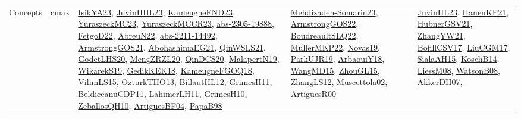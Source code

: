 {\begin{longtable}{lp{3cm}>{\raggedright}p{6cm}>{\raggedright}p{6cm}p{8cm}}
Concepts & cmax & \href{articles/IsikYA23.pdf}{IsikYA23}\cite{IsikYA23}, \href{papers/JuvinHHL23.pdf}{JuvinHHL23}\cite{JuvinHHL23}, \href{papers/KameugneFND23.pdf}{KameugneFND23}\cite{KameugneFND23}, \href{papers/YuraszeckMC23.pdf}{YuraszeckMC23}\cite{YuraszeckMC23}, \href{articles/YuraszeckMCCR23.pdf}{YuraszeckMCCR23}\cite{YuraszeckMCCR23}, \href{articles/abs-2305-19888.pdf}{abs-2305-19888}\cite{abs-2305-19888}, \href{articles/FetgoD22.pdf}{FetgoD22}\cite{FetgoD22}, \href{articles/AbreuN22.pdf}{AbreuN22}\cite{AbreuN22}, \href{articles/abs-2211-14492.pdf}{abs-2211-14492}\cite{abs-2211-14492}, \href{papers/ArmstrongGOS21.pdf}{ArmstrongGOS21}\cite{ArmstrongGOS21}, \href{articles/AbohashimaEG21.pdf}{AbohashimaEG21}\cite{AbohashimaEG21}, \href{articles/QinWSLS21.pdf}{QinWSLS21}\cite{QinWSLS21}, \href{papers/GodetLHS20.pdf}{GodetLHS20}\cite{GodetLHS20}, \href{articles/MengZRZL20.pdf}{MengZRZL20}\cite{MengZRZL20}, \href{articles/QinDCS20.pdf}{QinDCS20}\cite{QinDCS20}, \href{papers/MalapertN19.pdf}{MalapertN19}\cite{MalapertN19}, \href{articles/WikarekS19.pdf}{WikarekS19}\cite{WikarekS19}, \href{articles/GedikKEK18.pdf}{GedikKEK18}\cite{GedikKEK18}, \href{papers/KameugneFGOQ18.pdf}{KameugneFGOQ18}\cite{KameugneFGOQ18}, \href{papers/VilimLS15.pdf}{VilimLS15}\cite{VilimLS15}, \href{articles/OzturkTHO13.pdf}{OzturkTHO13}\cite{OzturkTHO13}, \href{papers/BillautHL12.pdf}{BillautHL12}\cite{BillautHL12}, \href{papers/GrimesH11.pdf}{GrimesH11}\cite{GrimesH11}, \href{articles/BeldiceanuCDP11.pdf}{BeldiceanuCDP11}\cite{BeldiceanuCDP11}, \href{papers/LahimerLH11.pdf}{LahimerLH11}\cite{LahimerLH11}, \href{papers/GrimesH10.pdf}{GrimesH10}\cite{GrimesH10}, \href{articles/ZeballosQH10.pdf}{ZeballosQH10}\cite{ZeballosQH10}, \href{papers/ArtiguesBF04.pdf}{ArtiguesBF04}\cite{ArtiguesBF04}, \href{articles/PapaB98.pdf}{PapaB98}\cite{PapaB98} & \href{papers/Mehdizadeh-Somarin23.pdf}{Mehdizadeh-Somarin23}\cite{Mehdizadeh-Somarin23}, \href{papers/ArmstrongGOS22.pdf}{ArmstrongGOS22}\cite{ArmstrongGOS22}, \href{papers/BoudreaultSLQ22.pdf}{BoudreaultSLQ22}\cite{BoudreaultSLQ22}, \href{articles/MullerMKP22.pdf}{MullerMKP22}\cite{MullerMKP22}, \href{articles/Novas19.pdf}{Novas19}\cite{Novas19}, \href{papers/ParkUJR19.pdf}{ParkUJR19}\cite{ParkUJR19}, \href{papers/ArbaouiY18.pdf}{ArbaouiY18}\cite{ArbaouiY18}, \href{articles/WangMD15.pdf}{WangMD15}\cite{WangMD15}, \href{papers/ZhouGL15.pdf}{ZhouGL15}\cite{ZhouGL15}, \href{papers/ZhangLS12.pdf}{ZhangLS12}\cite{ZhangLS12}, \href{papers/Muscettola02.pdf}{Muscettola02}\cite{Muscettola02}, \href{articles/ArtiguesR00.pdf}{ArtiguesR00}\cite{ArtiguesR00} & \href{papers/JuvinHL23.pdf}{JuvinHL23}\cite{JuvinHL23}, \href{papers/HanenKP21.pdf}{HanenKP21}\cite{HanenKP21}, \href{articles/HubnerGSV21.pdf}{HubnerGSV21}\cite{HubnerGSV21}, \href{articles/ZhangYW21.pdf}{ZhangYW21}\cite{ZhangYW21}, \href{papers/BofillCSV17.pdf}{BofillCSV17}\cite{BofillCSV17}, \href{papers/LiuCGM17.pdf}{LiuCGM17}\cite{LiuCGM17}, \href{papers/SialaAH15.pdf}{SialaAH15}\cite{SialaAH15}, \href{papers/KoschB14.pdf}{KoschB14}\cite{KoschB14}, \href{articles/LiessM08.pdf}{LiessM08}\cite{LiessM08}, \href{papers/WatsonB08.pdf}{WatsonB08}\cite{WatsonB08}, \href{papers/AkkerDH07.pdf}{AkkerDH07}\cite{AkkerDH07}, 
\end{longtable}}
